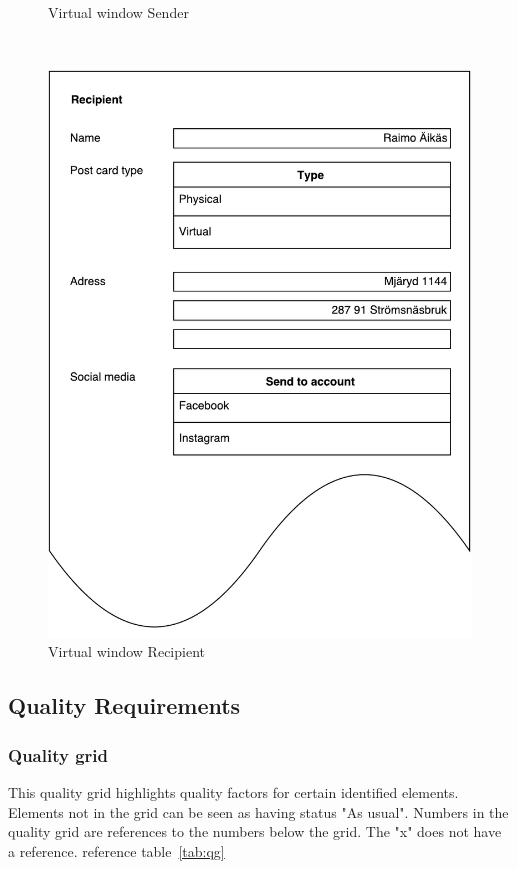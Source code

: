 \documentclass[10pt,a4paper]{article}
\begin{document}
\begin{centering}
\begin{figure}[!ht]
\begin{minipage}{0.3\textwidth}
\caption{Virtual window Sender}
\label{fig:virtualwindows_sender}
\end{minipage}\hfill
~
\begin{minipage}{0.3\textwidth}
\includegraphics[width=\linewidth]{Data_figures/virtualwindows_recipient.pdf}
\caption{Virtual window Recipient}
\label{fig:virtualwindows_recipient}
\end{minipage}

\end{figure}
\end{centering}


\subsection{Quality Requirements}



\subsubsection{Quality grid}
This quality grid highlights quality factors for certain identified elements. Elements not in the grid can be seen as having status "As usual". Numbers in the quality grid are references to the numbers below the grid. The "x" does not have a reference.  reference table~\ref{tab:qg}
\end{document}
